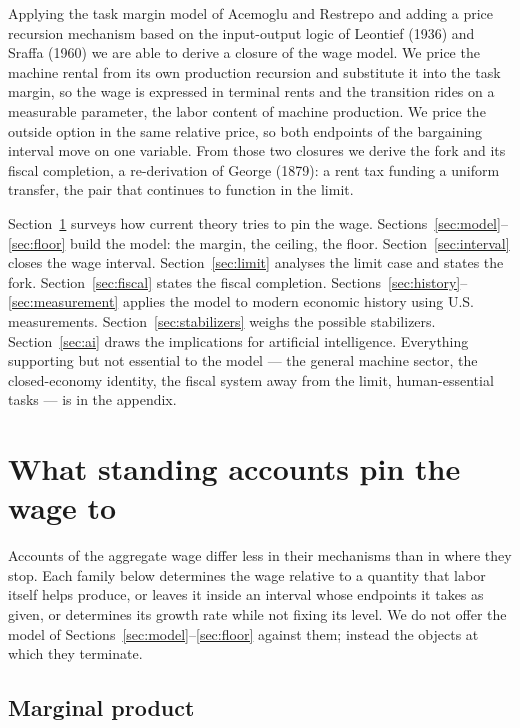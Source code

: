 \documentclass[12pt]{article}
\theoremstyle{plain}
\begin{document}
Applying the task margin model of Acemoglu and Restrepo and adding a price recursion mechanism based on the input-output logic of Leontief (1936) and Sraffa (1960) we are able to derive a closure of the wage model. We price the machine rental from its own production recursion and substitute it into the task margin, so the wage is expressed in terminal rents and the transition rides on a measurable parameter, the labor content of machine production. We price the outside option in the same relative price, so both endpoints of the bargaining interval move on one variable. From those two closures we derive the fork and its fiscal completion, a re-derivation of George (1879): a rent tax funding a uniform transfer, the pair that continues to function in the limit.

Section~\ref{sec:accounts} surveys how current theory tries to pin the wage. Sections~\ref{sec:model}--\ref{sec:floor} build the model: the margin, the ceiling, the floor. Section~\ref{sec:interval} closes the wage interval. Section~\ref{sec:limit} analyses the limit case and states the fork. Section~\ref{sec:fiscal} states the fiscal completion. Sections~\ref{sec:history}--\ref{sec:measurement} applies the model to modern economic history using U.S. measurements. Section~\ref{sec:stabilizers} weighs the possible stabilizers. Section~\ref{sec:ai} draws the implications for artificial intelligence. Everything supporting but not essential to the model --- the general machine sector, the closed-economy identity, the fiscal system away from the limit, human-essential tasks --- is in the appendix.

\section{What standing accounts pin the wage to}\label{sec:accounts}

Accounts of the aggregate wage differ less in their mechanisms than in where they stop. Each family below determines the wage relative to a quantity that labor itself helps produce, or leaves it inside an interval whose endpoints it takes as given, or determines its growth rate while not fixing its level. We do not offer the model of Sections~\ref{sec:model}--\ref{sec:floor} against them; instead the objects at which they terminate.

\subsection{Marginal product}\label{sec:marginal-product}
\end{document}
